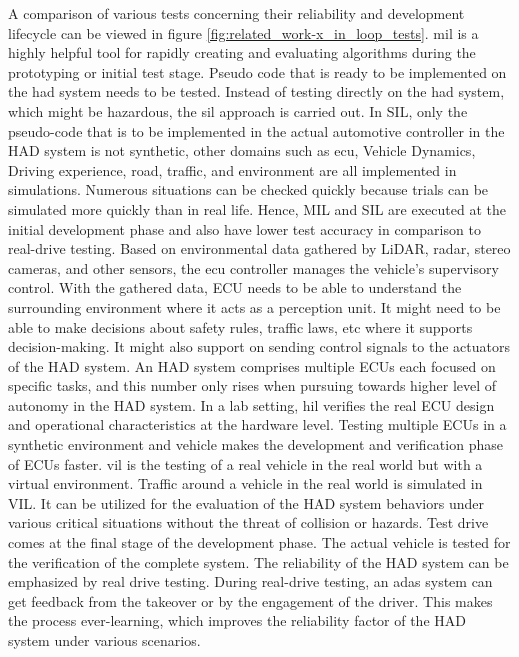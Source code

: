 A comparison of various tests concerning their reliability and development lifecycle can be viewed in figure \ref{fig:related_work-x_in_loop_tests}. \acrfull{mil} is a highly helpful tool for rapidly creating and evaluating algorithms during the prototyping or initial test stage. Pseudo code that is ready to be implemented on the \acrshort{had} system needs to be tested. Instead of testing directly on the \acrshort{had} system, which might be hazardous, the \acrfull{sil} approach is carried out. In SIL, only the pseudo-code that is to be implemented in the actual automotive controller in the HAD system is not synthetic, other domains such as \acrfull{ecu}, Vehicle Dynamics, Driving experience, road, traffic, and environment are all implemented in simulations. Numerous situations can be checked quickly because trials can be simulated more quickly than in real life. Hence, MIL and SIL are executed at the initial development phase and also have lower test accuracy in comparison to real-drive testing. Based on environmental data gathered by LiDAR, radar, stereo cameras, and other sensors, the \acrfull{ecu} controller manages the vehicle's supervisory control. With the gathered data, ECU needs to be able to understand the surrounding environment where it acts as a perception unit. It might need to be able to make decisions about safety rules, traffic laws, etc where it supports decision-making. It might also support on sending control signals to the actuators of the HAD system. An HAD system comprises multiple ECUs each focused on specific tasks, and this number only rises when pursuing towards higher level of autonomy in the HAD system. In a lab setting, \acrfull{hil} verifies the real ECU design and operational characteristics at the hardware level. Testing multiple ECUs in a synthetic environment and vehicle makes the development and verification phase of ECUs faster. \acrfull{vil} is the testing of a real vehicle in the real world but with a virtual environment. Traffic around a vehicle in the real world is simulated in VIL. It can be utilized for the evaluation of the HAD system behaviors under various critical situations without the threat of collision or hazards. Test drive comes at the final stage of the development phase. The actual vehicle is tested for the verification of the complete system. The reliability of the HAD system can be emphasized by real drive testing. During real-drive testing, an \acrfull{adas} system can get feedback from the takeover or by the engagement of the driver. This makes the process ever-learning, which improves the reliability factor of the HAD system under various scenarios.


